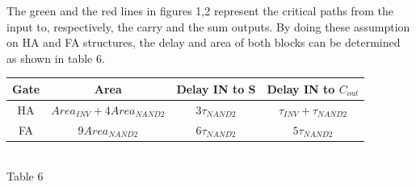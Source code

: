 \documentclass[11pt]{article} %
\begin{document}
\vspace{1em}
The green and the red lines in figures 1,2 represent the critical paths from the input to, respectively, the carry and the sum outputs. By doing these assumption on HA and FA structures, the delay and area of both blocks can be determined as shown in table 6.
\begin{center}
\begin{tabular}{|c|c|c|c|}
	\hline 
            Gate & Area & Delay IN to S & Delay IN to $C_{out}$ \\
	\hline          
	HA & $Area_{INV} + 4Area_{NAND2}$ & $3 \tau_{NAND2}$ & $\tau_{INV} + \tau_{NAND2}         $\\
	\hline 
	FA & $9Area_{NAND2}$ & $6 \tau_{NAND2}$  & $5 \tau_{NAND2}$  \\ 
	\hline 
\end{tabular} \\
\small{Table 6}
\end{center}
\newpage
\end{document}
